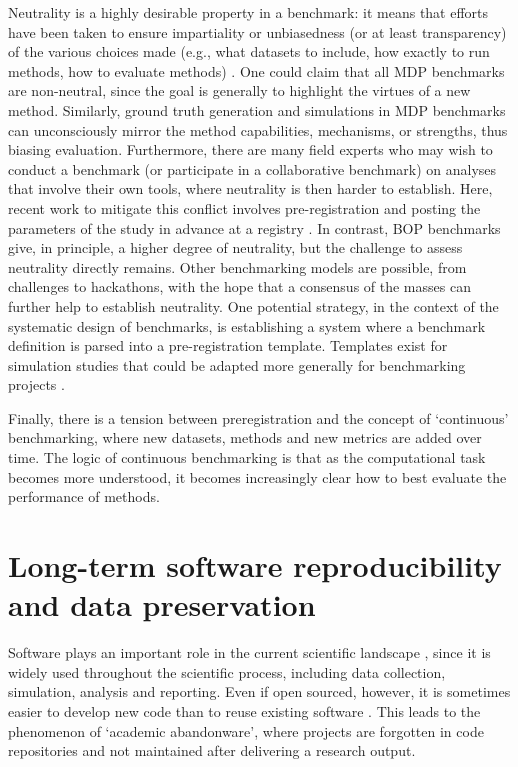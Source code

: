 \documentclass[11pt]{article}
\begin{document}
Neutrality is a highly desirable property in a benchmark: it means that efforts have been taken to ensure impartiality or unbiasedness (or at least transparency) of the various choices made (e.g., what datasets to include, how exactly to run methods, how to evaluate methods) \cite{Weber2019-el, Jelizarow2010-kr}. One could claim that all MDP benchmarks are non-neutral, since the goal is generally to highlight the virtues of a new method. Similarly, ground truth generation and simulations in MDP benchmarks can unconsciously mirror the method capabilities, mechanisms, or strengths, thus biasing evaluation. Furthermore, there are many field experts who may wish to conduct a benchmark (or participate in a collaborative benchmark) on analyses that involve their own tools, where neutrality is then harder to establish. Here,  recent work to mitigate this conflict involves pre-registration and posting the parameters of the study in advance at a registry \cite{Sullivan2019-wh, Olevska2021-if}. In contrast, BOP benchmarks give, in principle, a higher degree of neutrality, but the challenge to assess neutrality directly remains. Other benchmarking models are possible, from challenges to hackathons, with the hope that a consensus of the masses can further help to establish neutrality. One potential strategy, in the context of the systematic design of benchmarks, is establishing a system where a benchmark definition is parsed into a pre-registration template. Templates exist for simulation studies that could be adapted more generally for benchmarking projects \cite{Siepe2023-tz}. 

Finally, there is a tension between preregistration and the concept of `continuous' benchmarking, where new datasets, methods and new metrics are added over time. The logic of continuous benchmarking is that as the computational task becomes more understood, it becomes increasingly clear how to best evaluate the performance of methods. 

\section*{Long-term software reproducibility and data preservation}

Software plays an important role in the current scientific landscape \cite{Howison2015-rc}, since it is widely used throughout the scientific process, including data collection, simulation, analysis and reporting. Even if open sourced, however, it is sometimes easier to develop new code than to reuse existing software \cite{Trisovic2022-ol}. This leads to the phenomenon of `academic abandonware', where projects are forgotten in code repositories and not maintained after delivering a research output.
\end{document}
